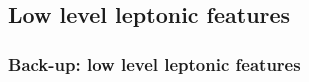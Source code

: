 \documentclass[xcolor=table,8pt]{beamer}
\begin{document}
    \subsection{Low level leptonic features}
    \begin{frame}[t]
        \frametitle{Back-up: low level leptonic features}
    
        \begin{figure}[!h]
            \begin{minipage}[c]{0.333\linewidth}
                \vspace{0pt}
                \centering
            \end{minipage}%
            \begin{minipage}[c]{0.333\linewidth}
                \vspace{0pt}
                \centering
\end{minipage}
\end{figure}
\end{frame}
\end{document}
